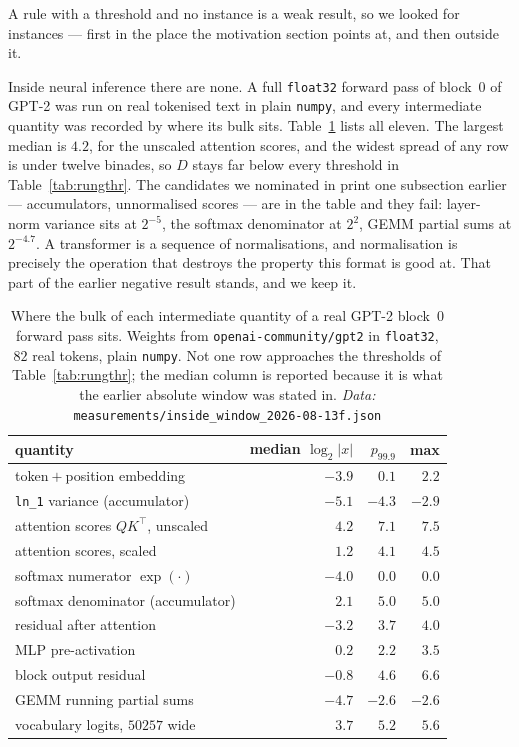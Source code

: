 \documentclass[11pt]{article}
\theoremstyle{definition}
\begin{document}
A rule with a threshold and no instance is a weak result, so we looked for
instances --- first in the place the motivation section points at, and then
outside it.

Inside neural inference there are none. A full \texttt{float32} forward pass of
block~$0$ of GPT-2 was run on real tokenised text in plain \texttt{numpy}, and
every intermediate quantity was recorded by where its bulk sits.
Table~\ref{tab:landing} lists all eleven. The largest median is $4.2$, for the
unscaled attention scores, and the widest spread of any row is under twelve
binades, so $D$ stays far below every threshold in Table~\ref{tab:rungthr}. The
candidates we nominated in print one subsection earlier --- accumulators,
unnormalised scores --- are in the table and they fail: layer-norm variance sits
at $2^{-5}$, the softmax denominator at $2^{2}$, GEMM partial sums at
$2^{-4.7}$. A transformer is a sequence of normalisations, and normalisation is
precisely the operation that destroys the property this format is good at. That
part of the earlier negative result stands, and we keep it.

\begin{table}[htbp]\centering
\caption{Where the bulk of each intermediate quantity of a real GPT-2 block~$0$
forward pass sits. Weights from \texttt{openai-community/gpt2} in \texttt{float32},
$82$ real tokens, plain \texttt{numpy}. Not one row approaches the thresholds of
Table~\ref{tab:rungthr}; the median column is reported because it is what the
earlier absolute window was stated in. \emph{Data:} \texttt{measurements/inside\_window\_2026-08-13f.json}}
\label{tab:landing}
\begin{tabular}{lrrr}
\hline
quantity & median $\log_2|x|$ & $p_{99.9}$ & max \\
\hline
token${}+{}$position embedding & $-3.9$ & $0.1$ & $2.2$ \\
\texttt{ln\_1} variance (accumulator) & $-5.1$ & $-4.3$ & $-2.9$ \\
attention scores $QK^{\!\top}$, unscaled & $4.2$ & $7.1$ & $7.5$ \\
attention scores, scaled & $1.2$ & $4.1$ & $4.5$ \\
softmax numerator $\exp(\cdot)$ & $-4.0$ & $0.0$ & $0.0$ \\
softmax denominator (accumulator) & $2.1$ & $5.0$ & $5.0$ \\
residual after attention & $-3.2$ & $3.7$ & $4.0$ \\
MLP pre-activation & $0.2$ & $2.2$ & $3.5$ \\
block output residual & $-0.8$ & $4.6$ & $6.6$ \\
GEMM running partial sums & $-4.7$ & $-2.6$ & $-2.6$ \\
vocabulary logits, $50257$ wide & $3.7$ & $5.2$ & $5.6$ \\
\hline
\end{tabular}
\end{table}
\end{document}
